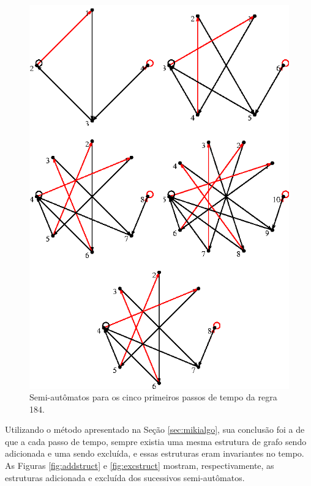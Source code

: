 \documentclass[12pt,a4paper]{article}
\begin{document}
\begin{figure}[htp]
\begin{center}
\includegraphics[scale=1]{img/184_5t.eps}
\caption{Semi-autômatos para os cinco primeiros passos de tempo da regra 184.}
\label{fig:184-5t}
\end{center}
\end{figure}

Utilizando o método apresentado na Seção \ref{sec:mikialgo}, sua conclusão
foi a de que a cada passo de tempo, sempre existia uma mesma estrutura
de grafo sendo adicionada e uma sendo excluída, e essas estruturas eram
invariantes no tempo. As Figuras \ref{fig:addstruct} e \ref{fig:excstruct}
mostram, respectivamente, as estruturas adicionada e excluída dos sucessivos
semi-autômatos.
\end{document}
